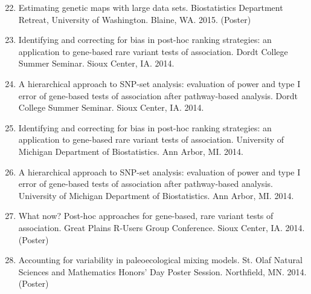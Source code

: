 \documentclass[margin]{res}
\newenvironment{benumerate}[1]{
    \let\oldItem\item
    \def\item{\addtocounter{enumi}{-2}\oldItem}
    
    \begin{enumerate}
    \setcounter{enumi}{#1}
    \addtocounter{enumi}{1}
}{
    \end{enumerate}
}
\begin{document}
\begin{resume}
\begin{benumerate}{21}
\item %
Estimating genetic maps with large data sets. Biostatistics Department Retreat, University of Washington. Blaine, WA. 2015. (Poster)


\item %
Identifying and correcting for bias in post-hoc ranking strategies: an application to gene-based rare variant tests of association. Dordt College Summer Seminar. Sioux Center, IA. 2014.

\item %
A hierarchical approach to SNP-set analysis: evaluation of power and type I error of gene-based tests of association after pathway-based analysis. Dordt College Summer Seminar. Sioux Center, IA. 2014.

\item %
Identifying and correcting for bias in post-hoc ranking strategies: an application to gene-based rare variant tests of association. University of Michigan Department of Biostatistics. Ann Arbor, MI. 2014.

\item %
A hierarchical approach to SNP-set analysis: evaluation of power and type I error of gene-based tests of association after pathway-based analysis. University of Michigan Department of Biostatistics. Ann Arbor, MI. 2014.


\item %
What now? Post-hoc approaches for gene-based, rare variant tests of association. Great Plains R-Users Group Conference. Sioux Center, IA. 2014. (Poster)

\item %
Accounting for variability in paleoecological mixing models. St. Olaf Natural Sciences and Mathematics Honors’ Day Poster Session. Northfield, MN. 2014. (Poster)


\end{benumerate}
\end{resume}
\end{document}

